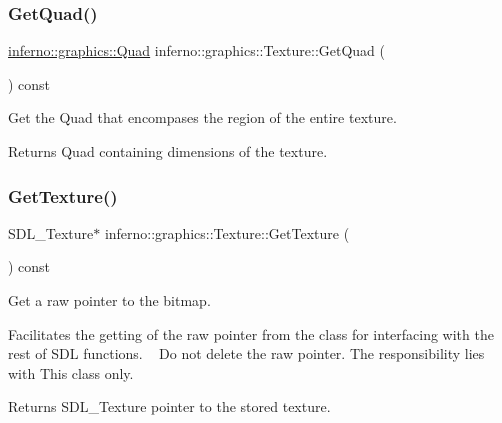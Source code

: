 \subsubsection{\texorpdfstring{Get\+Quad()}{GetQuad()}}
{\footnotesize\ttfamily \mbox{\hyperlink{classinferno_1_1graphics_1_1_rectangle}{inferno\+::graphics\+::\+Quad}} inferno\+::graphics\+::\+Texture\+::\+Get\+Quad (\begin{DoxyParamCaption}{ }\end{DoxyParamCaption}) const}



Get the Quad that encompases the region of the entire texture. 

\begin{DoxyReturn}{Returns}
Quad containing dimensions of the texture. 
\end{DoxyReturn}
\mbox{\label{classinferno_1_1graphics_1_1_texture_a42df17ded08f76751332725d66a88ce2}} 
\subsubsection{\texorpdfstring{Get\+Texture()}{GetTexture()}}
{\footnotesize\ttfamily S\+D\+L\+\_\+\+Texture$\ast$ inferno\+::graphics\+::\+Texture\+::\+Get\+Texture (\begin{DoxyParamCaption}{ }\end{DoxyParamCaption}) const\hspace{0.3cm}{\ttfamily [inline]}}



Get a raw pointer to the bitmap. 

Facilitates the getting of the raw pointer from the class for interfacing with the rest of S\+DL functions. ~\newline
 Do not delete the raw pointer. The responsibility lies with This class only. \begin{DoxyReturn}{Returns}
S\+D\+L\+\_\+\+Texture pointer to the stored texture. 
\end{DoxyReturn}
\mbox{\label{classinferno_1_1graphics_1_1_texture_a5409fce4e118c09b6caa012ced780a59}} 
